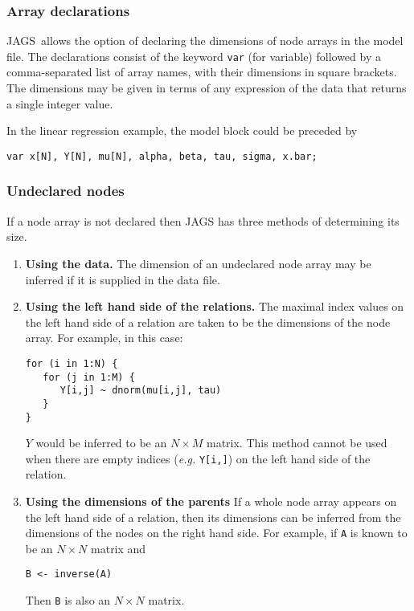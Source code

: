 \documentclass[11pt, a4paper, titlepage]{report}
\newcommand{\JAGS}{\textsf{JAGS}}
\begin{document}
\subsubsection*{Array declarations}

\JAGS\ allows the option of declaring the dimensions of node arrays in
the model file. The declarations consist of the keyword \texttt{var}
(for variable) followed by a comma-separated list of array names, with
their dimensions in square brackets. The dimensions may be given in
terms of any expression of the data that returns a single integer
value.

In the linear regression example, the model block could be preceded by
\begin{verbatim}
var x[N], Y[N], mu[N], alpha, beta, tau, sigma, x.bar;
\end{verbatim}

\subsubsection*{Undeclared nodes}

If a node array is not declared then JAGS has three methods of
determining its size.
\begin{enumerate}
\item {\bf Using the data.}  The dimension of an undeclared node array
  may be inferred if it is supplied in the data file.
\item {\bf Using the left hand side of the relations.}  The maximal
  index values on the left hand side of a relation are taken to be the
  dimensions of the node array.  For example, in this case:
\begin{verbatim}
for (i in 1:N) {
   for (j in 1:M) {
      Y[i,j] ~ dnorm(mu[i,j], tau)
   }
}
\end{verbatim}
$Y$ would be inferred to be an $N \times M$ matrix. This method cannot 
be used when there are empty indices ({\em e.g.} \verb+Y[i,]+) on the left
hand side of the relation.
\item {\bf Using the dimensions of the parents} If a whole node array
  appears on the left hand side of a relation, then its dimensions can
  be inferred from the dimensions of the nodes on the right hand side.
  For example, if \verb+A+ is known to be an $N \times N$ matrix
  and
\begin{verbatim}
B <- inverse(A)
\end{verbatim}
Then \verb+B+ is also an $N \times N$ matrix.
\end{enumerate}
\end{document}
